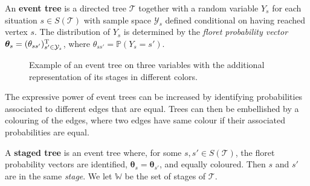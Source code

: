 \begin{definition}
An \textbf{event tree} is a directed tree $\mathcal{T}$ together with a random variable $Y_s$ for each situation $s\in S(\mathcal{T})$ with sample space $\mathcal{Y}_s$ defined conditional on having reached vertex $s$. The distribution of $Y_s$ is determined by the \emph{floret probability vector} $\bm{\theta}_s=(\theta_{ss'})^{\textnormal{T}}_{s'\in\mathcal{Y}_s}$, where  $\theta_{ss'}=\mathbb{P}(Y_s=s')$.
\end{definition}

\begin{figure}
\centerline{
\hspace*{-16mm} }
\caption{Example of an event tree on three variables with the additional representation of its stages in different colors. \label{fig:ET}}
\end{figure}

The expressive power of event trees can be increased by identifying probabilities associated to different edges that are equal. Trees can then be embellished by a colouring of the edges, where two edges have same colour if their associated probabilities are equal.

\begin{definition}
A \textbf{staged tree} is an event tree where, for some $s
,s'\in S(\mathcal{T})$, the floret probability vectors are identified, $\bm{\theta}_s=\bm{\theta}_{s'}$, and equally coloured. Then $s$ and $s'$ are in the same \emph{stage}. We let $\mathbb{W}$ be the set of stages of $\mathcal{T}$.
\end{definition}
  

